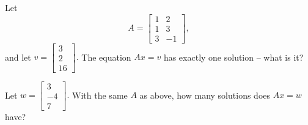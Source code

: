 \endedxvertical








Let  \[A = \left[ \begin{array}{cc} 1 & 2  \\ 
1 & 3 \\
3 & -1 \end{array} \right] ,\]
and let $v = \left[\begin{array}{c} 3 \\ 2 \\ 16 
\end{array} \right].$  The equation $Ax = v$ has exactly one solution -- what is it?  






Let $w = \left[\begin{array}{c} 3 \\ -4 \\ 7 
\end{array} \right].$  With the same $A$ as above, how many solutions does $Ax = w$ have?


